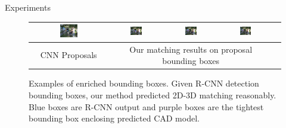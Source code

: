 \documentclass[serif,mathserif,final]{beamer}
\newcommand{\1}{\mathbb{I}} %
\begin{document}
\begin{frame}{}
\begin{columns}[t]
\begin{column}{0.23\linewidth}
\begin{block}{Experiments}
\begin{figure}
\begin{tabular}{|c|c|c|c|c|}
          \hline
          \includegraphics[width=0.24\textwidth]{bicycle_cnn/4a.png} &   
          \includegraphics[width=0.24\textwidth]{bicycle_cnn/4b.png} &   
          \includegraphics[width=0.24\textwidth]{bicycle_cnn/4c.png} &   
          \includegraphics[width=0.24\textwidth]{bicycle_cnn/4d.png}  \\
          \hline
          CNN Proposals & \multicolumn{3}{|c|}{Our matching results on proposal bounding boxes} \\
          \hline
        \end{tabular}
        \caption{Examples of enriched bounding boxes. Given R-CNN
            detection bounding boxes, our method predicted 2D-3D matching reasonably.
            Blue boxes are R-CNN output and purple boxes are the tightest
            bounding box enclosing predicted CAD model.}
          \label{fig:pascal12cnn}
        \end{figure}
        \vspace{-1.0em}
      \end{block}


\end{column}
\end{columns}
\end{frame}
\end{document}
